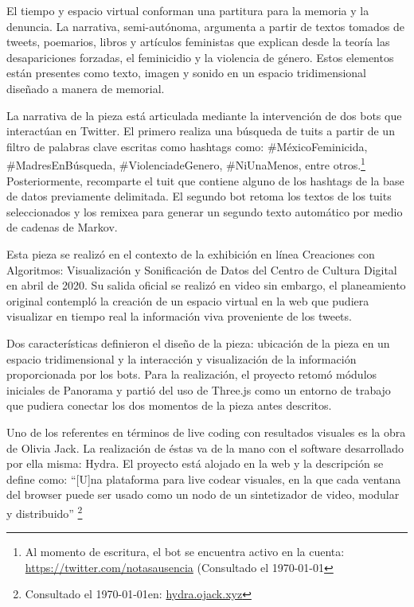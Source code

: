 El tiempo y espacio virtual conforman una partitura para la memoria y la denuncia. La narrativa, semi-autónoma, argumenta a partir de textos tomados de tweets, poemarios, libros y artículos feministas que explican desde la teoría las desapariciones forzadas, el feminicidio y la violencia de género. Estos elementos están presentes como texto, imagen y sonido en un espacio tridimensional diseñado a manera de memorial.

La narrativa de la pieza está articulada mediante la intervención de dos bots que interactúan en Twitter. El primero realiza una búsqueda de tuits a partir de un filtro de palabras clave escritas como hashtags como: \#MéxicoFeminicida, \#MadresEnBúsqueda, \#ViolenciadeGenero, \#NiUnaMenos, entre otros.\footnote{Al momento de escritura, el bot se encuentra activo en la cuenta: \url{https://twitter.com/notasausencia} (Consultado el \today} Posteriormente, recomparte el tuit que contiene alguno de los hashtags de la base de datos previamente delimitada. El segundo bot retoma los textos de los tuits seleccionados y los remixea para generar un segundo texto automático por medio de cadenas de Markov.

Esta pieza se realizó en el contexto de la exhibición en línea Creaciones con Algoritmos: Visualización y Sonificación de Datos del Centro de Cultura Digital en abril de 2020. Su salida oficial se realizó en video sin embargo, el planeamiento original contempló la creación de un espacio virtual en la web que pudiera visualizar en tiempo real la información viva proveniente de los tweets.

Dos características definieron el diseño de la pieza: ubicación de la pieza en un espacio tridimensional y la interacción y visualización de la información proporcionada por los bots. Para la realización, el proyecto retomó módulos iniciales de Panorama y partió del uso de Three.js como un entorno de trabajo que pudiera conectar los dos momentos de la pieza antes descritos.


Uno de los referentes en términos de live coding con resultados visuales es la obra de Olivia Jack. La realización de éstas va de la mano con el software desarrollado por ella misma: Hydra. El proyecto está alojado en la web y la descripción se define como: ``[U]na plataforma para live codear visuales, en la que cada ventana del browser puede ser usado como un nodo de un sintetizador de video, modular y distribuido'' \footnote{Consultado el \today en: \url{hydra.ojack.xyz}}

